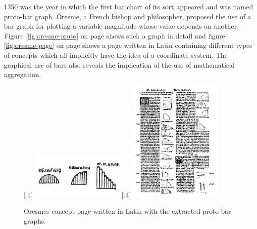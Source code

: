 1350 was the year in which the first bar chart of its sort appeared and was named proto-bar graph. Oresme, a French bishop and philosopher, proposed the use of a bar graph for plotting a variable magnitude whose value depends on another. Figure \ref{fig:oresme-proto} on page \pageref{fig:oresme-proto} shows such a graph in detail and figure \ref{fig:oresme-page} on page \pageref{fig:oresme-page} shows a page written in Latin containing different types of concepts which all implicitly have the idea of a coordinate system. The graphical use of bars also reveals the implication of the use of mathematical aggregation.

\begin{figure}[!htb]
    \centering
  [.4\linewidth]
    {
        \includegraphics[width=0.4\textwidth,keepaspectratio]
        {images/history/oresme-proto.jpg}
    }
    \qquad
    [.4\linewidth]
    {
        \includegraphics[width=0.4\textwidth,keepaspectratio]
        {images/history/oresme-page.jpg}
    }

    \caption{Oresmes concept page written in Latin with the extracted proto bar graphs.}
\end{figure}

